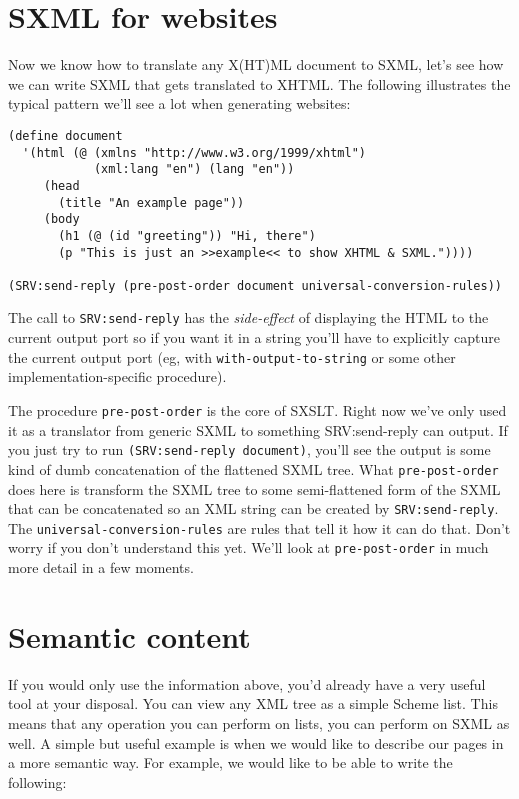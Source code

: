 \documentclass{article}
\begin{document}
\section{SXML for websites}

Now we know how to translate any X(HT)ML document to SXML, let's see
how we can write SXML that gets translated to XHTML.  The following
illustrates the typical pattern we'll see a lot when generating websites:

\begin{verbatim}
(define document
  '(html (@ (xmlns "http://www.w3.org/1999/xhtml")
            (xml:lang "en") (lang "en"))
     (head
       (title "An example page"))
     (body
       (h1 (@ (id "greeting")) "Hi, there")
       (p "This is just an >>example<< to show XHTML & SXML."))))

(SRV:send-reply (pre-post-order document universal-conversion-rules))
\end{verbatim}

The call to \verb|SRV:send-reply| has the \emph{side-effect} of
displaying the HTML to the current output port so if you want it in a
string you'll have to explicitly capture the current output port
(eg, with \verb|with-output-to-string| or some other
 implementation-specific procedure).

The procedure \verb|pre-post-order| is the core of SXSLT.  Right now
we've only used it as a translator from generic SXML to something
SRV:send-reply can output.  If you just try to run
\verb|(SRV:send-reply document)|, you'll see the output is some kind of
dumb concatenation of the flattened SXML tree.  What
\verb|pre-post-order| does here is transform the SXML tree to some
semi-flattened form of the SXML that can be concatenated so an XML
string can be created by \verb|SRV:send-reply|.  The
\verb|universal-conversion-rules| are rules that tell it how it can do
that.  Don't worry if you don't understand this yet.  We'll look at
\verb|pre-post-order| in much more detail in a few moments.


\section{Semantic content}

If you would only use the information above, you'd already have a very
useful tool at your disposal.  You can view any XML tree as a simple
Scheme list.  This means that any operation you can perform on lists,
you can perform on SXML as well.  A simple but useful example is when
we would like to describe our pages in a more semantic way.  For
example, we would like to be able to write the following:
\end{document}
